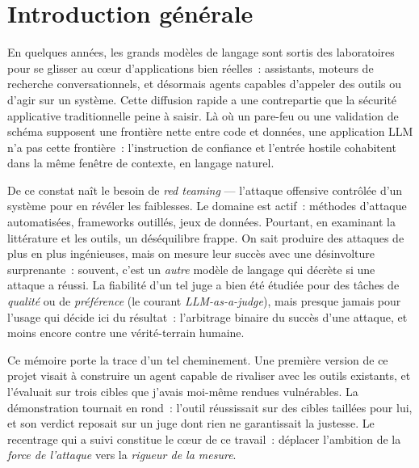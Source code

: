 \chapter*{Introduction générale}

En quelques années, les grands modèles de langage sont sortis des laboratoires pour se glisser au cœur d'applications bien réelles~: assistants, moteurs de recherche conversationnels, et désormais agents capables d'appeler des outils ou d'agir sur un système. Cette diffusion rapide a une contrepartie que la sécurité applicative traditionnelle peine à saisir. Là où un pare-feu ou une validation de schéma supposent une frontière nette entre code et données, une application LLM n'a pas cette frontière~: l'instruction de confiance et l'entrée hostile cohabitent dans la même fenêtre de contexte, en langage naturel.

De ce constat naît le besoin de \emph{red teaming} — l'attaque offensive contrôlée d'un système pour en révéler les faiblesses. Le domaine est actif~: méthodes d'attaque automatisées, frameworks outillés, jeux de données. Pourtant, en examinant la littérature et les outils, un déséquilibre frappe. On sait produire des attaques de plus en plus ingénieuses, mais on mesure leur succès avec une désinvolture surprenante~: souvent, c'est un \emph{autre} modèle de langage qui décrète si une attaque a réussi. La fiabilité d'un tel juge a bien été étudiée pour des tâches de \emph{qualité} ou de \emph{préférence} (le courant \emph{LLM-as-a-judge}), mais presque jamais pour l'usage qui décide ici du résultat~: l'arbitrage binaire du succès d'une attaque, et moins encore contre une vérité-terrain humaine.

Ce mémoire porte la trace d'un tel cheminement. Une première version de ce projet visait à construire un agent capable de rivaliser avec les outils existants, et l'évaluait sur trois cibles que j'avais moi-même rendues vulnérables. La démonstration tournait en rond~: l'outil réussissait sur des cibles taillées pour lui, et son verdict reposait sur un juge dont rien ne garantissait la justesse. Le recentrage qui a suivi constitue le cœur de ce travail~: déplacer l'ambition de la \emph{force de l'attaque} vers la \emph{rigueur de la mesure}.

